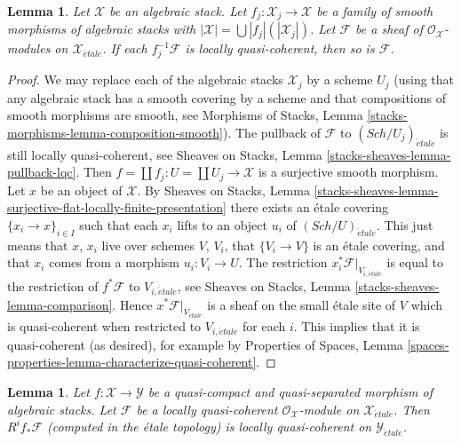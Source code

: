 \documentclass{stacks-project}
\theoremstyle{plain}
\newtheorem{lemma}[subsection]{Lemma}
\theoremstyle{definition}
\theoremstyle{remark}
\numberwithin{equation}{subsection}
\def\Sch{\mathit{Sch}}
\def\etale{{\acute{e}tale}}
\begin{document}
\begin{lemma}
\label{lemma-check-lqc-on-etale-covering}
Let $\mathcal{X}$ be an algebraic stack. Let
$f_j : \mathcal{X}_j \to \mathcal{X}$ be a family of smooth
morphisms of algebraic stacks with
$|\mathcal{X}| =\bigcup |f_j|(|\mathcal{X}_j|)$.
Let $\mathcal{F}$ be a sheaf of $\mathcal{O}_\mathcal{X}$-modules
on $\mathcal{X}_\etale$. If each $f_j^{-1}\mathcal{F}$
is locally quasi-coherent, then so is $\mathcal{F}$.
\end{lemma}

\begin{proof}
We may replace each of the algebraic stacks $\mathcal{X}_j$ by
a scheme $U_j$ (using that any algebraic stack has a smooth covering by
a scheme and that compositions of smooth morphisms are smooth, see
Morphisms of Stacks, Lemma \ref{stacks-morphisms-lemma-composition-smooth}).
The pullback of $\mathcal{F}$ to $(\Sch/U_j)_\etale$ is still
locally quasi-coherent, see
Sheaves on Stacks, Lemma \ref{stacks-sheaves-lemma-pullback-lqc}.
Then $f = \coprod f_j : U = \coprod U_j \to \mathcal{X}$ is a surjective
smooth morphism. Let $x$ be an object of $\mathcal{X}$. By
Sheaves on Stacks, Lemma
\ref{stacks-sheaves-lemma-surjective-flat-locally-finite-presentation}
there exists an \'etale covering $\{x_i \to x\}_{i \in I}$
such that each $x_i$ lifts to an object $u_i$ of $(\Sch/U)_\etale$.
This just means that $x$, $x_i$ live over schemes $V$, $V_i$, that
$\{V_i \to V\}$ is an \'etale covering, and that $x_i$ comes from
a morphism $u_i : V_i \to U$. The restriction
$x_i^*\mathcal{F}|_{V_{i, \etale}}$ is equal to the restriction
of $f^*\mathcal{F}$ to $V_{i, \etale}$, see
Sheaves on Stacks, Lemma \ref{stacks-sheaves-lemma-comparison}.
Hence $x^*\mathcal{F}|_{V_\etale}$
is a sheaf on the small \'etale site of $V$ which is quasi-coherent
when restricted to $V_{i, \etale}$ for each $i$.
This implies that it is quasi-coherent (as desired), for example by
Properties of Spaces, Lemma
\ref{spaces-properties-lemma-characterize-quasi-coherent}.
\end{proof}

\begin{lemma}
\label{lemma-pushforward-locally-quasi-coherent}
Let $f : \mathcal{X} \to \mathcal{Y}$ be a quasi-compact and
quasi-separated morphism of algebraic stacks. Let 
$\mathcal{F}$ be a locally quasi-coherent
$\mathcal{O}_\mathcal{X}$-module on $\mathcal{X}_\etale$.
Then $R^if_*\mathcal{F}$ (computed in the \'etale topology) is
locally quasi-coherent on $\mathcal{Y}_\etale$.
\end{lemma}
\end{document}
